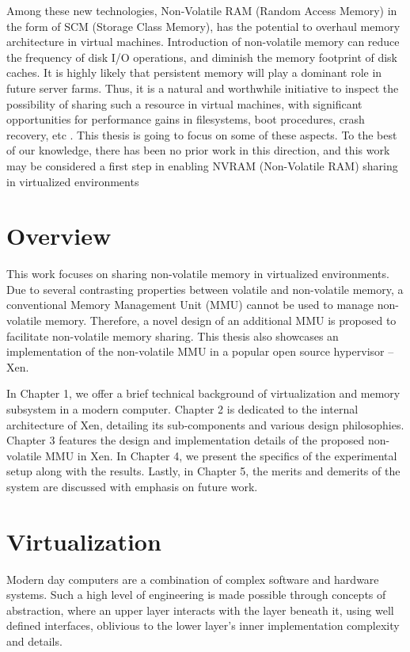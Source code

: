 Among these new technologies, Non-Volatile RAM (Random Access Memory) in the form of SCM (Storage Class Memory), has the potential to overhaul memory architecture in virtual machines. Introduction of non-volatile memory can reduce the frequency of disk I/O operations, and diminish the memory footprint of disk caches. It is highly likely that persistent memory will play a dominant role in future server farms. Thus, it is a natural and worthwhile initiative to inspect the possibility of sharing such a resource in virtual machines, with significant opportunities for performance gains in filesystems, boot procedures, crash recovery, etc \cite{nvm_benefits1} \cite{nvm_benefits2}. This thesis is going to focus on some of these aspects. To the best of our knowledge, there has been no prior work in this direction, and this work may be considered a first step in enabling NVRAM (Non-Volatile RAM) sharing in virtualized environments 

\section{Overview}

This work focuses on sharing non-volatile memory in virtualized environments. Due to several contrasting properties between volatile and non-volatile memory, a conventional Memory Management Unit (MMU) cannot be used to manage non-volatile memory. Therefore, a novel design of an additional MMU is proposed to facilitate non-volatile memory sharing. This thesis also showcases an implementation of the non-volatile MMU in a popular open source hypervisor -- Xen.

In Chapter 1, we offer a brief technical background of virtualization and memory subsystem in a modern computer. Chapter 2 is dedicated to the internal architecture of Xen, detailing its sub-components and various design philosophies. Chapter 3 features the design and implementation details of the proposed non-volatile MMU in Xen. In Chapter 4, we present the specifics of the experimental setup along with the results. Lastly, in Chapter 5, the merits and demerits of the system are discussed with emphasis on future work. 

\section{Virtualization}
Modern day computers are a combination of complex software and hardware systems. Such a high level of engineering is made possible through concepts of abstraction, where an upper layer interacts with the layer beneath it, using well defined interfaces, oblivious to the lower layer's inner implementation complexity and details.

